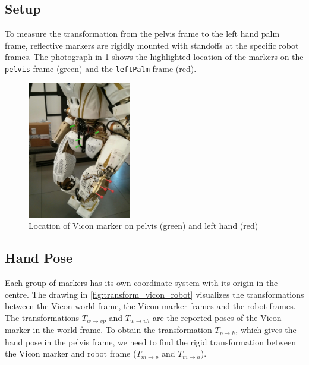 \subsection{Setup}

To measure the transformation from the pelvis frame to the left hand palm frame, reflective markers are rigidly mounted with standoffs at the specific robot frames. The photograph in \cref{fig:vicon_marker} shows the highlighted location of the markers on the \texttt{pelvis} frame (green) and the \texttt{leftPalm} frame (red).

\begin{figure}[h]
\captionsetup{width=0.4\textwidth}
\centering
\includegraphics[width=0.4\textwidth]{images/vicon_pose/vicon_marker_col.jpg}
\caption[Location of Vicon marker]{Location of Vicon marker on pelvis (green) and left hand (red)}
\label{fig:vicon_marker}
\end{figure}


\subsection{Hand Pose}

Each group of markers has its own coordinate system with its origin in the centre.
The drawing in \cref{fig:transform_vicon_robot} visualizes the transformations between the Vicon world frame, the Vicon marker frames and the robot frames.
The transformations $T_{w \rightarrow vp}$ and $T_{w \rightarrow vh}$ are the reported poses of the Vicon marker in the world frame.
To obtain the transformation $T_{p \rightarrow h}$, which gives the hand pose in the pelvis frame, we need to find the rigid transformation between the Vicon marker and robot frame ($T_{m \rightarrow p}$ and $T_{m \rightarrow h}$).

